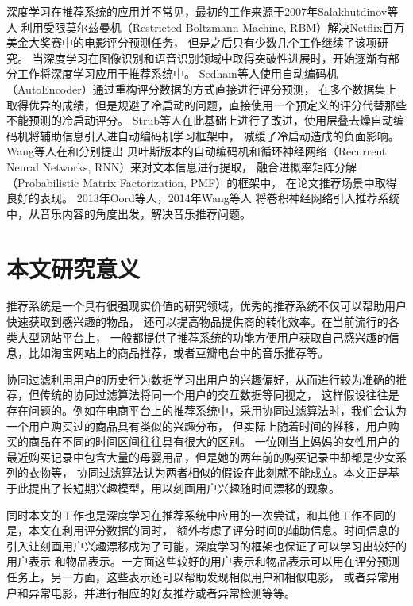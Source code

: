 深度学习在推荐系统的应用并不常见，最初的工作来源于2007年Salakhutdinov等人\parencite{salakhutdinov2007restricted}
利用受限莫尔兹曼机（Restricted Boltzmann Machine, RBM）解决Netflix百万美金大奖赛中的电影评分预测任务，
但是之后只有少数几个工作\parencite{phung2009ordinal}继续了该项研究。
当深度学习在图像识别和语音识别领域中取得突破性进展时，开始逐渐有部分工作将深度学习应用于推荐系统中。
Sedhain等人\parencite{sedhain2015autorec}使用自动编码机（AutoEncoder）通过重构评分数据的方式直接进行评分预测，
在多个数据集上取得优异的成绩，但是规避了冷启动的问题，直接使用一个预定义的评分代替那些不能预测的冷启动评分。
Strub等人\parencite{strub2016hybrid}在此基础上进行了改进，使用层叠去燥自动编码机将辅助信息引入进自动编码机学习框架中，
减缓了冷启动造成的负面影响。
Wang等人在\parencite{wang2015collaborative}和\parencite{wang2016collaborative}分别提出
贝叶斯版本的自动编码机和循环神经网络（Recurrent Neural Networks, RNN）来对文本信息进行提取，
融合进概率矩阵分解（Probabilistic Matrix Factorization, PMF）\parencite{salakhutdinov2007probabilistic}的框架中，
在论文推荐场景中取得良好的表现。
2013年Oord等人\parencite{van2013deep}，2014年Wang等人\parencite{wang2014improving}
将卷积神经网络引入推荐系统中，从音乐内容的角度出发，解决音乐推荐问题。

\section{本文研究意义}
推荐系统是一个具有很强现实价值的研究领域，优秀的推荐系统不仅可以帮助用户快速获取到感兴趣的物品，
还可以提高物品提供商的转化效率。在当前流行的各类大型网站平台上，
一般都提供了推荐系统的功能方便用户获取自己感兴趣的信息，比如淘宝网站上的商品推荐，或者豆瓣电台中的音乐推荐等。

协同过滤利用用户的历史行为数据学习出用户的兴趣偏好，从而进行较为准确的推荐，但传统的协同过滤算法将同一个用户的交互数据等同视之，
这样假设往往是存在问题的。例如在电商平台上的推荐系统中，采用协同过滤算法时，我们会认为一个用户购买过的商品具有类似的兴趣分布，
但实际上随着时间的推移，用户购买的商品在不同的时间区间往往具有很大的区别。
一位刚当上妈妈的女性用户的最近购买记录中包含大量的母婴用品，但是她的两年前的购买记录中却都是少女系列的衣物等，
协同过滤算法认为两者相似的假设在此刻就不能成立。本文正是基于此提出了长短期兴趣模型，用以刻画用户兴趣随时间漂移的现象。

同时本文的工作也是深度学习在推荐系统中应用的一次尝试，和其他工作不同的是，本文在利用评分数据的同时，
额外考虑了评分时间的辅助信息。时间信息的引入让刻画用户兴趣漂移成为了可能，深度学习的框架也保证了可以学习出较好的用户表示
和物品表示。一方面这些较好的用户表示和物品表示可以用在评分预测任务上，另一方面，这些表示还可以帮助发现相似用户和相似电影，
或者异常用户和异常电影，并进行相应的好友推荐或者异常检测等等。

